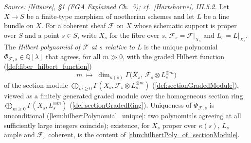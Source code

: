 \begin{definition}\leanok
  \label{def:hilbert_polynomial}
  \textit{Source: [Nitsure], \S 1 (FGA Explained Ch.~5); cf.\ [Hartshorne],
  III.5.2.}
  Let \(X \to S\) be a finite-type morphism of noetherian schemes and let \(L\)
  be a line bundle on \(X\). For a coherent sheaf \(\mathcal{F}\) on \(X\) whose
  schematic support is proper over \(S\) and a point \(s \in S\), write \(X_s\)
  for the fibre over \(s\), \(\mathcal{F}_s = \mathcal{F}|_{X_s}\) and
  \(L_s = L|_{X_s}\). The \emph{Hilbert polynomial of \(\mathcal{F}\) at \(s\)
  relative to \(L\)} is the unique polynomial
  \(\Phi_{\mathcal{F},s} \in \mathbb{Q}[\lambda]\) that agrees, for all
  \(m \gg 0\), with the graded Hilbert function
  (\cref{def:fiber_hilbert_function})
  \[
    m \;\longmapsto\; \dim_{\kappa(s)} \Gamma\bigl(X_s,\, \mathcal{F}_s \otimes L_s^{\otimes m}\bigr)
  \]
  of the section module
  \(\bigoplus_{m \ge 0} \Gamma(X_s, \mathcal{F}_s \otimes L_s^{\otimes m})\)
  (\cref{def:sectionGradedModule}), viewed as a finitely generated graded module
  over the homogeneous section ring
  \(\bigoplus_{m \ge 0} \Gamma(X_s, L_s^{\otimes m})\)
  (\cref{def:sectionGradedRing}). Uniqueness of \(\Phi_{\mathcal{F},s}\) is
  unconditional (\cref{lem:hilbertPolynomial_unique}: two polynomials agreeing
  at all sufficiently large integers coincide); existence, for \(X_s\) proper
  over \(\kappa(s)\), \(L_s\) ample and \(\mathcal{F}_s\) coherent, is the
  content of \cref{thm:hilbertPoly_of_sectionModule}.


\end{definition}
